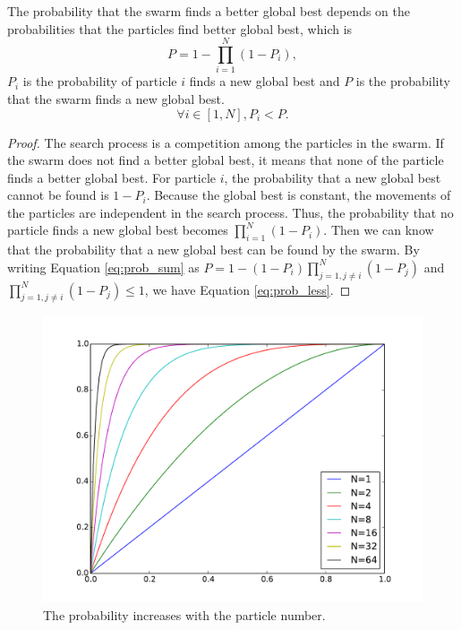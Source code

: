 \begin{mythm}
\label{thm:multimodal:swarm:prob}
The probability that the swarm finds a better global best depends on the probabilities that the particles find better global best, which is
\begin{equation}
\label{eq:prob_sum}
P = 1 - \prod_{i=1}^{N} ( 1 - P_{i} ),
\end{equation}
$ P_{i} $ is the probability of particle $ i $ finds a new global best
and $ P $ is the probability that the swarm finds a new global best.
\begin{equation}
\label{eq:prob_less}
\forall i \in [1, N], P_{i} < P.
\end{equation}
\begin{proof}
The search process is a competition among the particles in the swarm.
If the swarm does not find a better global best, it means that none of the particle finds a better global best.
For particle $ i $, the probability that a new global best cannot be found is $ 1 - P_{i} $.
Because the global best is constant, the movements of the particles are independent in the search process.
Thus, the probability that no particle finds a new global best becomes
$ \prod_{i=1}^{N} ( 1 - P_{i} ) $.
Then we can know that the probability that a new global best can be found by the swarm.
By writing Equation \ref{eq:prob_sum} as $ P = 1 - ( 1 - P_{i} ) \prod_{j=1, j \not = i}^{N}  ( 1 - P_{j} ) $ and $ \prod_{j=1, j \not = i}^{N}  ( 1 - P_{j} ) \leq 1 $,
we have Equation \ref{eq:prob_less}.
\end{proof}
\end{mythm}

\begin{figure}
\centering
\includegraphics[width=0.7\linewidth]{./fig/probRise}
\caption{The probability increases with the particle number.}
\label{fig:probRise}
\end{figure}

